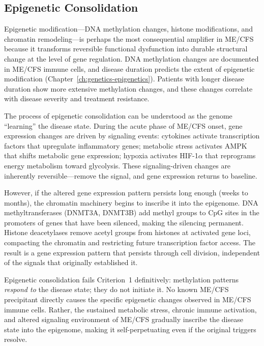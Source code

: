 \subsection{Epigenetic Consolidation}
\label{sec:amp-epigenetic}

Epigenetic modification---DNA methylation changes, histone modifications, and chromatin remodeling---is perhaps the most consequential amplifier in ME/CFS because it transforms reversible functional dysfunction into durable structural change at the level of gene regulation. DNA methylation changes are documented in ME/CFS immune cells, and disease duration predicts the extent of epigenetic modification (Chapter~\ref{ch:genetics-epigenetics}). Patients with longer disease duration show more extensive methylation changes, and these changes correlate with disease severity and treatment resistance.

The process of epigenetic consolidation can be understood as the genome ``learning'' the disease state. During the acute phase of ME/CFS onset, gene expression changes are driven by signaling events: cytokines activate transcription factors that upregulate inflammatory genes; metabolic stress activates AMPK that shifts metabolic gene expression; hypoxia activates HIF-1$\alpha$ that reprograms energy metabolism toward glycolysis. These signaling-driven changes are inherently reversible---remove the signal, and gene expression returns to baseline.

However, if the altered gene expression pattern persists long enough (weeks to months), the chromatin machinery begins to inscribe it into the epigenome. DNA methyltransferases (DNMT3A, DNMT3B) add methyl groups to CpG sites in the promoters of genes that have been silenced, making the silencing permanent. Histone deacetylases remove acetyl groups from histones at activated gene loci, compacting the chromatin and restricting future transcription factor access. The result is a gene expression pattern that persists through cell division, independent of the signals that originally established it.

Epigenetic consolidation fails Criterion~1 definitively: methylation patterns \emph{respond to} the disease state; they do not initiate it. No known ME/CFS precipitant directly causes the specific epigenetic changes observed in ME/CFS immune cells. Rather, the sustained metabolic stress, chronic immune activation, and altered signaling environment of ME/CFS gradually inscribe the disease state into the epigenome, making it self-perpetuating even if the original triggers resolve.

